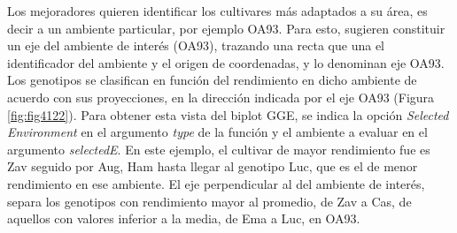 
Los mejoradores quieren identificar los cultivares más adaptados a su área, es decir a un ambiente particular, por ejemplo OA93. Para esto, \citet{YanHunt2002} sugieren constituir un eje del ambiente de interés (OA93), trazando una recta que una el identificador del ambiente y el origen de coordenadas, y lo denominan eje OA93. Los genotipos se  clasifican en función del rendimiento en dicho ambiente de acuerdo con sus proyecciones, en la dirección indicada por el eje OA93 (Figura \ref{fig:fig4122}). Para obtener esta vista del biplot GGE, se indica la opción \emph{Selected Environment} en el argumento \emph{type} de la función y el ambiente a evaluar en el argumento  \emph{selectedE}. En este ejemplo, el cultivar de mayor rendimiento fue es Zav seguido por Aug, Ham hasta llegar al genotipo Luc, que es el de menor rendimiento en ese ambiente. El eje perpendicular al del ambiente de interés, separa los genotipos con rendimiento mayor al promedio, de Zav a Cas, de aquellos con valores inferior a la media, de Ema a Luc, en OA93.
 
